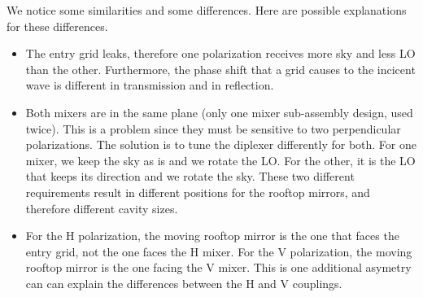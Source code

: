We notice some similarities and some differences.
Here are possible explanations for these differences.
\begin{itemize}
    \item The entry grid leaks, therefore one polarization receives more sky and less LO than the other.  Furthermore, the phase shift that a grid causes to the incicent wave is different in transmission and in reflection.
    \item Both mixers are in the same plane (only one mixer sub-assembly design, used twice).  This is a problem since they must be sensitive to two perpendicular polarizations.  The solution is to tune the diplexer differently for both.  For one mixer, we keep the sky as is and we rotate the LO.  For the other, it is the LO that keeps its direction and we rotate the sky.  These two different requirements result in different positions for the rooftop mirrors, and therefore different cavity sizes.
    \item For the H polarization, the moving rooftop mirror is the one that faces the entry grid, not the one faces the H mixer.  For the V polarization, the moving rooftop mirror is the one facing the V mixer.  This is one additional asymetry can can explain the differences between the H and V couplings.
\end{itemize}
